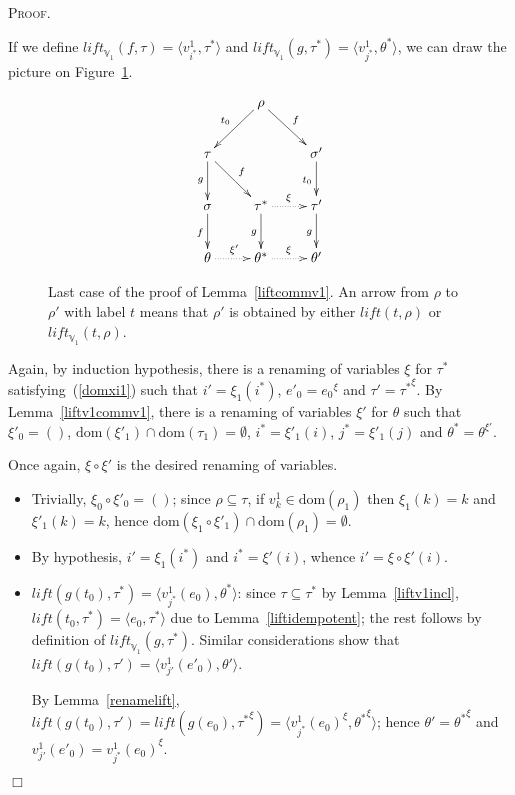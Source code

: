 \documentclass{article}
\newenvironment{proof}{\smallskip\textsc{Proof.}}{\hspace*{\fill}$\Box$}
\newcommand{\V}{{\mathbb V}}
\newcommand{\liftv}[1]{\ensuremath{\mathit{lift}_{\V_{#1}}}}
\newcommand{\lift}{\ensuremath{\mathit{lift}}}
\newcommand{\dom}{\ensuremath{\mathrm{dom}}}
\newcommand{\renamevar}[2]{\ensuremath{{#1}^{#2}}}
\newcommand{\isrenamevar}[3]{\ensuremath{{#1}=\renamevar{#2}{#3}}}
\newcommand{\idn}{()}
\begin{document}
\begin{proof}
\begin{enumerate}
If we define $\liftv1(f,\tau)=\langle v^1_{i^\ast},\tau^\ast\rangle$
and $\liftv1(g,\tau^\ast)=\langle v^1_{j^\ast},\theta^\ast\rangle$,
we can draw the picture on Figure~\ref{fig:liftcommv1}.
\begin{figure}[htb]
\[\xymatrix{
 & \rho \ar[dl]_{t_0} \ar[dr]^{f} \\
 \tau \ar[d]_{g} \ar[dr]^{f} & & \sigma' \ar[d]_{t_0} \\
 \sigma \ar[d]_{f} & \tau^\ast \ar@{.>}[r]^{\xi} \ar[d]_{g}
 & \tau' \ar[d]_{g} \\
 \theta \ar@{.>}[r]^{\xi'} & \theta^\ast \ar@{.>}[r]^{\xi} & \theta' 
}\]
\caption{Last case of the proof of Lemma~\ref{liftcommv1}.  An arrow
from $\rho$ to $\rho'$ with label $t$ means that $\rho'$ is obtained
by either $\lift(t,\rho)$ or $\liftv1(t,\rho)$.}
\label{fig:liftcommv1}
\end{figure}
Again, by induction hypothesis, there is a renaming of variables $\xi$
for $\tau^\ast$ satisfying~(\ref{domxi1}) such that $i'=\xi_1(i^\ast)$,
{\isrenamevar{e'_0}{e_0}\xi} and {\isrenamevar{\tau'}{\tau^\ast}\xi}.
By Lemma~\ref{liftv1commv1}, there is a renaming of variables
$\xi'$ for $\theta$ such that $\xi'_0=\idn$,
$\dom(\xi'_1)\cap\dom(\tau_1)=\emptyset$, $i^\ast=\xi'_1(i)$,
$j^\ast=\xi'_1(j)$ and {\isrenamevar{\theta^\ast}\theta{\xi'}}.

Once again, $\xi\circ\xi'$ is the desired renaming of variables.
\begin{itemize}
\item Trivially, $\xi_0\circ\xi'_0=\idn$; since $\rho\subseteq\tau$,
if $v^1_k\in\dom(\rho_1)$ then $\xi_1(k)=k$ and $\xi'_1(k)=k$, hence
$\dom(\xi_1\circ\xi'_1)\cap\dom(\rho_1)=\emptyset$.
\item By hypothesis, $i'=\xi_1(i^\ast)$ and $i^\ast=\xi'(i)$, whence
$i'=\xi\circ\xi'(i)$.
\item $\lift(g(t_0),\tau^\ast)=\langle v^1_{j^\ast}(e_0),\theta^\ast\rangle$:
since $\tau\subseteq\tau^\ast$ by Lemma~\ref{liftv1incl},
$\lift(t_0,\tau^\ast)=\langle e_0,\tau^\ast\rangle$ due to
Lemma~\ref{liftidempotent}; the rest follows by definition
of $\liftv1(g,\tau^\ast)$.  Similar considerations show that
$\lift(g(t_0),\tau')=\langle v^1_{j'}(e'_0),\theta'\rangle$.

By Lemma~\ref{renamelift},
$\lift(g(t_0),\tau')=\lift(g(e_0),\renamevar{\tau^\ast}\xi)=%
\langle\renamevar{v^1_{j^\ast}(e_0)}\xi,\renamevar{\theta^\ast}\xi\rangle$;
hence {\isrenamevar{\theta'}{\theta^\ast}\xi} and
{\isrenamevar{v^1_{j'}(e'_0)}{v^1_{j^\ast}(e_0)}\xi}.


\end{itemize}
\end{enumerate}
\end{proof}
\end{document}
